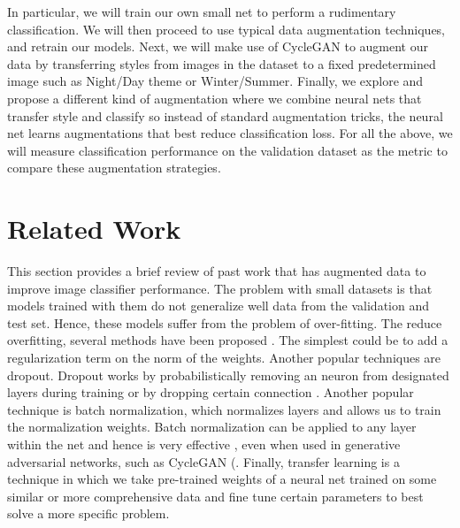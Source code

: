 \documentclass[10pt,twocolumn,letterpaper]{article}
\begin{document}
In particular, we will train our own small net to perform a rudimentary classification. We will then proceed to use typical data augmentation techniques, and retrain our models. Next, we will make use of CycleGAN \cite{cyclegan} to augment our data by transferring styles from images in the dataset to a fixed predetermined image such as Night/Day theme or Winter/Summer. Finally, we explore and propose a different kind of augmentation where we combine neural nets that transfer style and classify so instead of standard augmentation tricks, the neural net learns augmentations that best reduce classification loss. For all the above, we will measure classification performance on the validation dataset as the metric to compare these augmentation strategies. 

\section{Related Work}


This section provides a brief review of past work that has augmented data to improve image classifier performance. The problem with small datasets is that models trained with them do not generalize well data from the validation and test set. Hence, these models suffer from the problem of over-fitting. The reduce overfitting, several methods have been proposed \cite{regularization}. The simplest could be to add a regularization term on the norm of the weights. Another popular techniques are dropout. Dropout works by probabilistically removing an neuron from designated layers during training or by dropping certain connection \cite{dropout1} \cite{dropout2}. Another popular technique is batch normalization, which normalizes layers and allows us to train the normalization weights. Batch normalization can be applied to any layer within the net and hence is very effective \cite{batchnorm}, even when used in generative adversarial networks, such as CycleGAN (\cite{batchnorm_cyclegan}. Finally, transfer learning is a technique in which we take pre-trained weights of a neural net trained on some similar or more comprehensive data and fine tune certain parameters to best solve a more specific problem. \\
\end{document}

